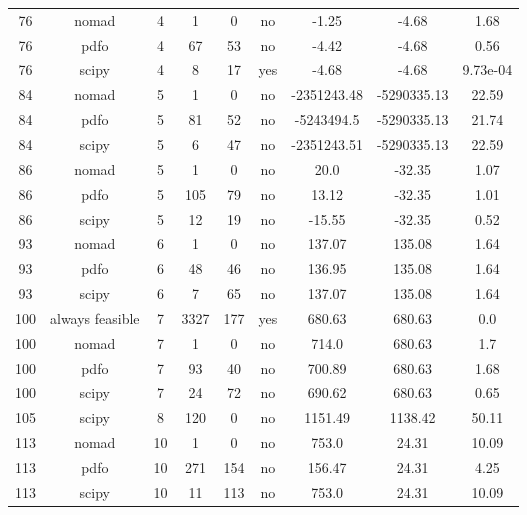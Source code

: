\begin{scriptsize}
\begin{center}
\begin{longtable}{ccccccccc}
 76 &           nomad &  4 &      1 &      0 &      no &       -1.25 &       -4.68 &     1.68\\
 76 &            pdfo &  4 &     67 &     53 &      no &       -4.42 &       -4.68 &     0.56\\
 76 &           scipy &  4 &      8 &     17 &     yes &       -4.68 &       -4.68 & 9.73e-04\\
 84 &           nomad &  5 &      1 &      0 &      no & -2351243.48 & -5290335.13 &    22.59\\
 84 &            pdfo &  5 &     81 &     52 &      no &  -5243494.5 & -5290335.13 &    21.74\\
 84 &           scipy &  5 &      6 &     47 &      no & -2351243.51 & -5290335.13 &    22.59\\
 86 &           nomad &  5 &      1 &      0 &      no &        20.0 &      -32.35 &     1.07\\
 86 &            pdfo &  5 &    105 &     79 &      no &       13.12 &      -32.35 &     1.01\\
 86 &           scipy &  5 &     12 &     19 &      no &      -15.55 &      -32.35 &     0.52\\
 93 &           nomad &  6 &      1 &      0 &      no &      137.07 &      135.08 &     1.64\\
 93 &            pdfo &  6 &     48 &     46 &      no &      136.95 &      135.08 &     1.64\\
 93 &           scipy &  6 &      7 &     65 &      no &      137.07 &      135.08 &     1.64\\
100 & always feasible &  7 &   3327 &    177 &     yes &      680.63 &      680.63 &      0.0\\
100 &           nomad &  7 &      1 &      0 &      no &       714.0 &      680.63 &      1.7\\
100 &            pdfo &  7 &     93 &     40 &      no &      700.89 &      680.63 &     1.68\\
100 &           scipy &  7 &     24 &     72 &      no &      690.62 &      680.63 &     0.65\\
105 &           scipy &  8 &    120 &      0 &      no &     1151.49 &     1138.42 &    50.11\\
113 &           nomad & 10 &      1 &      0 &      no &       753.0 &       24.31 &    10.09\\
113 &            pdfo & 10 &    271 &    154 &      no &      156.47 &       24.31 &     4.25\\
113 &           scipy & 10 &     11 &    113 &      no &       753.0 &       24.31 &    10.09\\

\end{longtable}
\end{center}
\end{scriptsize}
